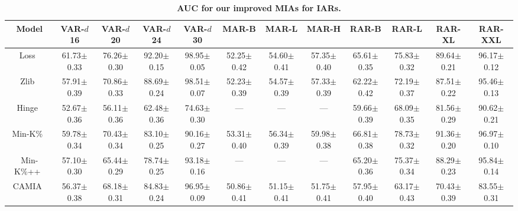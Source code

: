 \begin{table}[h!]
\centering
\tiny
\setlength{\tabcolsep}{3pt}
\caption{\textbf{AUC for our improved MIAs for IARs.}}
\begin{tabular}{cccccccccccc}
\toprule
        Model & VAR-$\mathit{d}$16 & VAR-$\mathit{d}$20 & VAR-$\mathit{d}$24 & VAR-$\mathit{d}$30 & MAR-B & MAR-L & MAR-H & RAR-B & RAR-L & RAR-XL & RAR-XXL \\
\midrule
Loss~\citep{yeom2018lossmia} & 61.73{\tiny $\pm$0.33} & 76.26{\tiny $\pm$0.30} & 92.20{\tiny $\pm$0.15} & 98.95{\tiny $\pm$0.05} & 52.25{\tiny $\pm$0.42} & 54.60{\tiny $\pm$0.41} & 57.35{\tiny $\pm$0.40} & 65.61{\tiny $\pm$0.35} & 75.83{\tiny $\pm$0.32} & 89.64{\tiny $\pm$0.21} & 96.17{\tiny $\pm$0.12} \\
Zlib~\citep{carlini2021extractLLM} & 57.91{\tiny $\pm$0.39} & 70.86{\tiny $\pm$0.33} & 88.69{\tiny $\pm$0.24} & 98.51{\tiny $\pm$0.07} & 52.23{\tiny $\pm$0.39} & 54.57{\tiny $\pm$0.39} & 57.33{\tiny $\pm$0.39} & 62.22{\tiny $\pm$0.42} & 72.19{\tiny $\pm$0.37} & 87.51{\tiny $\pm$0.22} & 95.46{\tiny $\pm$0.13} \\
Hinge~\citep{bertran2024scalable} & 52.67{\tiny $\pm$0.36} & 56.11{\tiny $\pm$0.36} & 62.48{\tiny $\pm$0.36} & 74.63{\tiny $\pm$0.30} & --- & --- & --- & 59.66{\tiny $\pm$0.39} & 68.09{\tiny $\pm$0.35} & 81.56{\tiny $\pm$0.29} & 90.62{\tiny $\pm$0.21} \\
Min-K\%~\citep{shi2024detecting} & 59.78{\tiny $\pm$0.34} & 70.43{\tiny $\pm$0.34} & 83.10{\tiny $\pm$0.25} & 90.16{\tiny $\pm$0.27} & 53.31{\tiny $\pm$0.40} & 56.34{\tiny $\pm$0.39} & 59.98{\tiny $\pm$0.38} & 66.81{\tiny $\pm$0.38} & 78.73{\tiny $\pm$0.32} & 91.36{\tiny $\pm$0.20} & 96.97{\tiny $\pm$0.10} \\
Min-K\%++~\citep{zhang2024min} & 57.10{\tiny $\pm$0.30} & 65.44{\tiny $\pm$0.29} & 78.74{\tiny $\pm$0.25} & 93.18{\tiny $\pm$0.16} & --- & --- & --- & 65.20{\tiny $\pm$0.36} & 75.37{\tiny $\pm$0.34} & 88.29{\tiny $\pm$0.23} & 95.84{\tiny $\pm$0.14} \\
CAMIA~\citep{chang2024context} & 56.37{\tiny $\pm$0.38} & 68.18{\tiny $\pm$0.31} & 84.83{\tiny $\pm$0.24} & 96.95{\tiny $\pm$0.09} & 50.86{\tiny $\pm$0.41} & 51.15{\tiny $\pm$0.41} & 51.75{\tiny $\pm$0.41} & 57.95{\tiny $\pm$0.40} & 63.17{\tiny $\pm$0.43} & 70.43{\tiny $\pm$0.39} & 83.55{\tiny $\pm$0.31} \\
\bottomrule
\end{tabular}
\label{tab:auc_our_mias}
\end{table}




